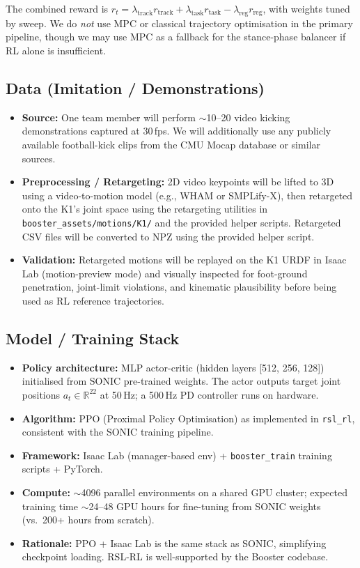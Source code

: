 \documentclass[12pt]{article}
\begin{document}
The combined reward is $r_t = \lambda_\text{track} r_\text{track} + \lambda_\text{task} r_\text{task} - \lambda_\text{reg} r_\text{reg}$, with weights tuned by sweep. We do \emph{not} use MPC or classical trajectory optimisation in the primary pipeline, though we may use MPC as a fallback for the stance-phase balancer if RL alone is insufficient.

\subsection{Data (Imitation / Demonstrations)}
\begin{itemize}[noitemsep]
    \item \textbf{Source:} One team member will perform $\sim$10--20 video kicking demonstrations captured at 30\,fps. We will additionally use any publicly available football-kick clips from the CMU Mocap database or similar sources.
    \item \textbf{Preprocessing / Retargeting:} 2D video keypoints will be lifted to 3D using a video-to-motion model (e.g., WHAM or SMPLify-X), then retargeted onto the K1's joint space using the retargeting utilities in \texttt{booster\_assets/motions/K1/} and the provided helper scripts. Retargeted CSV files will be converted to NPZ using the provided helper script.
    \item \textbf{Validation:} Retargeted motions will be replayed on the K1 URDF in Isaac Lab (motion-preview mode) and visually inspected for foot-ground penetration, joint-limit violations, and kinematic plausibility before being used as RL reference trajectories.
\end{itemize}

\subsection{Model / Training Stack}
\begin{itemize}[noitemsep]
    \item \textbf{Policy architecture:} MLP actor-critic (hidden layers [512, 256, 128]) initialised from SONIC pre-trained weights. The actor outputs target joint positions $a_t \in \mathbb{R}^{22}$ at 50\,Hz; a 500\,Hz PD controller runs on hardware.
    \item \textbf{Algorithm:} PPO (Proximal Policy Optimisation) as implemented in \texttt{rsl\_rl}, consistent with the SONIC training pipeline.
    \item \textbf{Framework:} Isaac Lab (manager-based env) + \texttt{booster\_train} training scripts + PyTorch.
    \item \textbf{Compute:} $\sim$4096 parallel environments on a shared GPU cluster; expected training time $\sim$24--48 GPU hours for fine-tuning from SONIC weights (vs.\ 200+ hours from scratch).
    \item \textbf{Rationale:} PPO + Isaac Lab is the same stack as SONIC, simplifying checkpoint loading. RSL-RL is well-supported by the Booster codebase.
\end{itemize}
\end{document}

